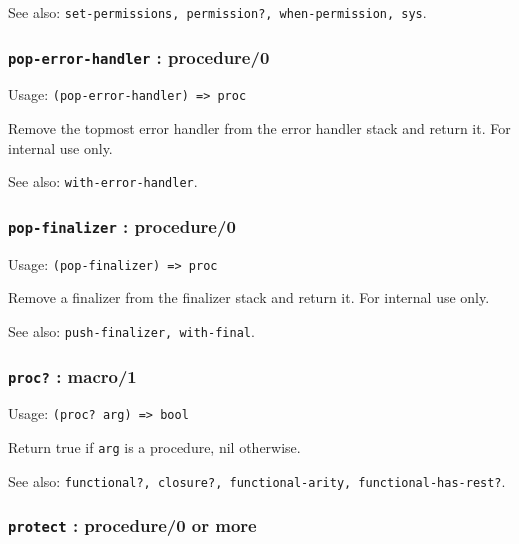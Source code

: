 \documentclass[
]{article}
\newcommand{\passthrough}[1]{#1}
\begin{document}
See also:
\passthrough{\lstinline!set-permissions, permission?, when-permission, sys!}.

\hypertarget{pop-error-handler-procedure0}{%
\subsubsection{\texorpdfstring{\texttt{pop-error-handler} :
procedure/0}{pop-error-handler : procedure/0}}\label{pop-error-handler-procedure0}}

Usage: \passthrough{\lstinline!(pop-error-handler) => proc!}

Remove the topmost error handler from the error handler stack and return
it. For internal use only.

See also: \passthrough{\lstinline!with-error-handler!}.

\hypertarget{pop-finalizer-procedure0}{%
\subsubsection{\texorpdfstring{\texttt{pop-finalizer} :
procedure/0}{pop-finalizer : procedure/0}}\label{pop-finalizer-procedure0}}

Usage: \passthrough{\lstinline!(pop-finalizer) => proc!}

Remove a finalizer from the finalizer stack and return it. For internal
use only.

See also: \passthrough{\lstinline!push-finalizer, with-final!}.

\hypertarget{proc-macro1}{%
\subsubsection{\texorpdfstring{\texttt{proc?} :
macro/1}{proc? : macro/1}}\label{proc-macro1}}

Usage: \passthrough{\lstinline!(proc? arg) => bool!}

Return true if \passthrough{\lstinline!arg!} is a procedure, nil
otherwise.

See also:
\passthrough{\lstinline!functional?, closure?, functional-arity, functional-has-rest?!}.

\hypertarget{protect-procedure0-or-more}{%
\subsubsection{\texorpdfstring{\texttt{protect} : procedure/0 or
more}{protect : procedure/0 or more}}\label{protect-procedure0-or-more}}
\end{document}
